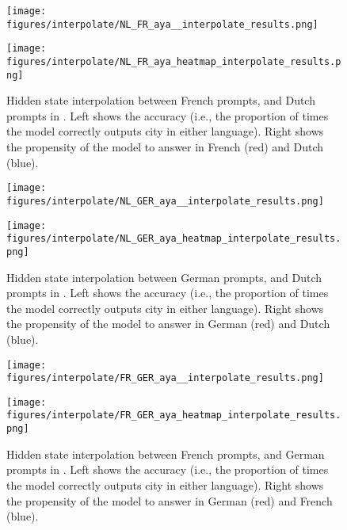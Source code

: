 \begin{figure}[h]
\begin{minipage}{0.49\textwidth}
    \centering
    \texttt{[image: figures/interpolate/NL\_FR\_aya\_\_interpolate\_results.png]} 
\end{minipage}
\begin{minipage}{0.49\textwidth}
    \centering
    \texttt{[image: figures/interpolate/NL\_FR\_aya\_heatmap\_interpolate\_results.png]} 
\end{minipage}
\caption{Hidden state interpolation between French prompts, and Dutch prompts in \aya. Left shows the accuracy (i.e., the proportion of times the model correctly outputs city in either language). Right shows the propensity of the model to answer in French (red) and Dutch (blue). }
\end{figure}

\begin{figure}[h]
\begin{minipage}{0.49\textwidth}
    \centering
    \texttt{[image: figures/interpolate/NL\_GER\_aya\_\_interpolate\_results.png]} 
\end{minipage}
\begin{minipage}{0.49\textwidth}
    \centering
    \texttt{[image: figures/interpolate/NL\_GER\_aya\_heatmap\_interpolate\_results.png]} 
\end{minipage}
\caption{Hidden state interpolation between German prompts, and Dutch prompts in \aya. Left shows the accuracy (i.e., the proportion of times the model correctly outputs city in either language). Right shows the propensity of the model to answer in German (red) and Dutch (blue). }
\end{figure}

\begin{figure}[h]
\begin{minipage}{0.49\textwidth}
    \centering
    \texttt{[image: figures/interpolate/FR\_GER\_aya\_\_interpolate\_results.png]} 
\end{minipage}
\begin{minipage}{0.49\textwidth}
    \centering
    \texttt{[image: figures/interpolate/FR\_GER\_aya\_heatmap\_interpolate\_results.png]} 
\end{minipage}
\caption{Hidden state interpolation between French prompts, and German prompts in \aya. Left shows the accuracy (i.e., the proportion of times the model correctly outputs city in either language). Right shows the propensity of the model to answer in German (red) and French (blue). }
\end{figure}

